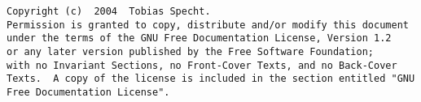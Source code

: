 \begin{verbatim}
Copyright (c)  2004  Tobias Specht.
Permission is granted to copy, distribute and/or modify this document
under the terms of the GNU Free Documentation License, Version 1.2
or any later version published by the Free Software Foundation;
with no Invariant Sections, no Front-Cover Texts, and no Back-Cover
Texts.  A copy of the license is included in the section entitled "GNU
Free Documentation License".
\end{verbatim}